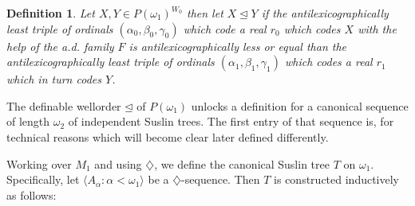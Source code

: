 \documentclass[a4paper,11pt]{article}
\newtheorem{definition}[theorem]{Definition}
\begin{document}
  \begin{definition}\label{Definition Wellorder}
  Let $X, Y \in P(\omega_1)^{W_0}$ then let
  $X \unlhd Y$ if the antilexicographically least triple of ordinals $(\alpha_0, \beta_0, \gamma_0)$
  which code a real $r_0$ which codes $X$ with the help of the a.d. family $F$ is antilexicographically less or equal than 
  the antilexicographically least triple of ordinals $(\alpha_1, \beta_1, \gamma_1)$ which codes a real $r_1$ which in turn
  codes $Y$.

  \end{definition}


The definable wellorder $\unlhd$ of $P(\omega_1)$ unlocks a definition for a
canonical sequence of length $\omega_2$ of independent Suslin trees. The first entry of 
that sequence is, for technical reasons which will 
become clear later defined differently.

Working over $M_1$ and using $\diamondsuit$, we define the canonical Suslin tree $T$ on $\omega_1$.
Specifically, let $\langle A_\alpha : \alpha < \omega_1 \rangle$ be a $\diamondsuit$-sequence. Then $T$ is constructed inductively as follows:
\end{document}

